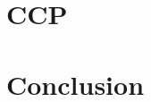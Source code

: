 \documentclass[fontsize=12pt,paper=letter,twosided,cleardoublepage=plain,final]{scrbook}
\begin{document}
\chapter{CCP}\label{s:ccp}











\chapter{Conclusion}\label{s:thesis-concl}


\backmatter

\begin{spacing}{1}
    

\end{spacing}
\end{document}
